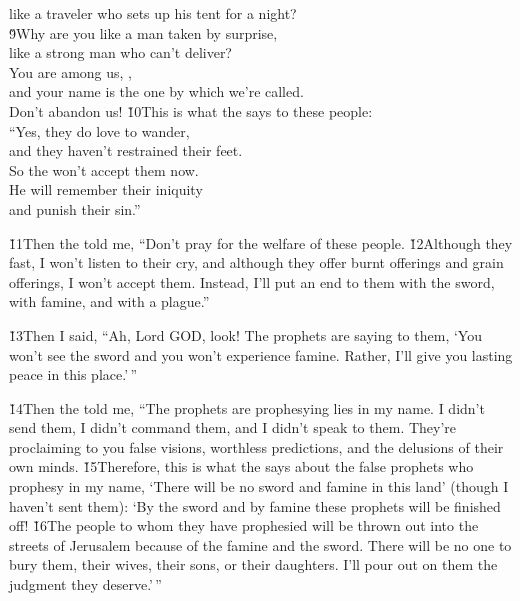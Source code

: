 \begin{poetry}
\poemll    like a traveler who sets up his tent for a night? \\
\poeml \v{9}Why are you like a man taken by surprise, \\
\poemll    like a strong man who can't deliver? \\
\poeml You are among us, , \\
\poemll    and your name is the one by which we're called. \\
\poemlll       Don't abandon us!
\poeml \v{10}This is what the  says to these people: \\
\poemll    ``Yes, they do love to wander, \\
\poemlll       and they haven't restrained their feet. \\
\poeml So the  won't accept them now. \\
\poemll    He will remember their iniquity \\
\poemlll       and punish their sin.''
\end{poetry}

\v{11}Then the  told me, ``Don't pray for the welfare of these people. \v{12}Although they fast, I won't listen to their cry, and although they offer burnt offerings and grain offerings, I won't accept them. Instead, I'll put an end to them with the sword, with famine, and with a plague.''

\v{13}Then I said, ``Ah, Lord GOD, look! The prophets are saying to them, `You won't see the sword and you won't experience famine. Rather, I'll give you lasting peace in this place.'\,''

\v{14}Then the  told me, ``The prophets are prophesying lies in my name. I didn't send them, I didn't command them, and I didn't speak to them. They're proclaiming to you false visions, worthless predictions, and the delusions of their own minds. \v{15}Therefore, this is what the  says about the false prophets who prophesy in my name, `There will be no sword and famine in this land' (though I haven't sent them): `By the sword and by famine these prophets will be finished off! \v{16}The people to whom they have prophesied will be thrown out into the streets of Jerusalem because of the famine and the sword. There will be no one to bury them, their wives, their sons, or their daughters. I'll pour out on them the judgment they deserve.'\,''

